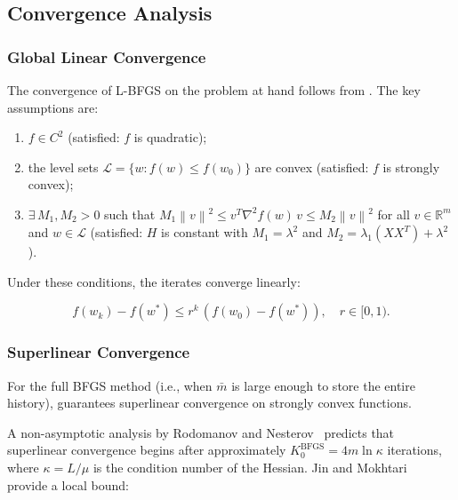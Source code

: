 \documentclass[11pt,a4paper]{article}
\newcommand{\R}{\mathbb{R}}
\newcommand{\norm}[1]{\left\|#1\right\|}
\begin{document}
\subsection{Convergence Analysis}
\label{sec:convergence}

\subsubsection{Global Linear Convergence}

The convergence of L-BFGS on the problem at hand follows from 
\cite[Theorem~1]{liu1989limited}. The key assumptions are:

\begin{enumerate}[nosep]
    \item $f \in C^2$ (satisfied: $f$ is quadratic);
    \item the level sets $\mathcal{L} = \{w : f(w) \leq f(w_0)\}$ are convex 
          (satisfied: $f$ is strongly convex);
    \item $\exists\, M_1, M_2 > 0$ such that $M_1\norm{v}^2 \leq v^T \nabla^2 f(w)\,v \leq M_2\norm{v}^2$ 
          for all $v \in \R^m$ and $w \in \mathcal{L}$ 
          (satisfied: $H$ is constant with $M_1 = \lambda^2$ and $M_2 = \lambda_1(XX^T) + \lambda^2$).
\end{enumerate}

Under these conditions, the iterates converge linearly:

\begin{equation}
    f(w_k) - f(w^*) \leq r^k\,(f(w_0) - f(w^*)), \quad r \in [0,1).
\end{equation}

\subsubsection{Superlinear Convergence}

For the full BFGS method (i.e., when $\bar{m}$ is large enough to store the entire history), 
\cite[Theorem~6.6]{nocedal2006numerical} guarantees superlinear convergence on strongly 
convex functions.

A non-asymptotic analysis by Rodomanov and Nesterov~\cite{rodomanov2021} predicts that 
superlinear convergence begins after approximately $K_0^{\text{BFGS}} = 4m\ln\kappa$ iterations, 
where $\kappa = L/\mu$ is the condition number of the Hessian. 
Jin and Mokhtari~\cite{jin2022} provide a local bound:
\end{document}
